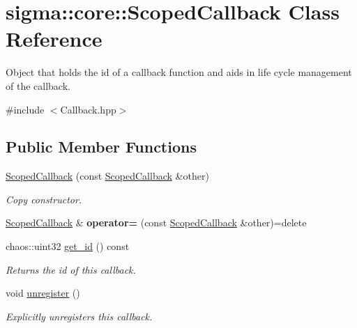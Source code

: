 \hypertarget{classsigma_1_1core_1_1_scoped_callback}{\section{sigma\-:\-:core\-:\-:Scoped\-Callback Class Reference}
\label{classsigma_1_1core_1_1_scoped_callback}
}


Object that holds the id of a callback function and aids in life cycle management of the callback.  




{\ttfamily \#include $<$Callback.\-hpp$>$}

\subsection*{Public Member Functions}
\begin{DoxyCompactItemize}
\item 
\hyperlink{classsigma_1_1core_1_1_scoped_callback_ae39d91862f76b1804acc8edae410678e}{Scoped\-Callback} (const \hyperlink{classsigma_1_1core_1_1_scoped_callback}{Scoped\-Callback} \&other)
\begin{DoxyCompactList}\small\item\em Copy constructor. \end{DoxyCompactList}\item 
\hypertarget{classsigma_1_1core_1_1_scoped_callback_ab0eabc2e0c158643758501f9c6bc444c}{\hyperlink{classsigma_1_1core_1_1_scoped_callback}{Scoped\-Callback} \& {\bfseries operator=} (const \hyperlink{classsigma_1_1core_1_1_scoped_callback}{Scoped\-Callback} \&other)=delete}\label{classsigma_1_1core_1_1_scoped_callback_ab0eabc2e0c158643758501f9c6bc444c}

\item 
\hypertarget{classsigma_1_1core_1_1_scoped_callback_a3b4ae371184bb639999677cf66440461}{chaos\-::uint32 \hyperlink{classsigma_1_1core_1_1_scoped_callback_a3b4ae371184bb639999677cf66440461}{get\-\_\-id} () const }\label{classsigma_1_1core_1_1_scoped_callback_a3b4ae371184bb639999677cf66440461}

\begin{DoxyCompactList}\small\item\em Returns the id of this callback. \end{DoxyCompactList}\item 
void \hyperlink{classsigma_1_1core_1_1_scoped_callback_ad8d8ea4671f58077c8f9ef020e52e125}{unregister} ()
\begin{DoxyCompactList}\small\item\em Explicitly unregisters this callback. \end{DoxyCompactList}\end{DoxyCompactItemize}


